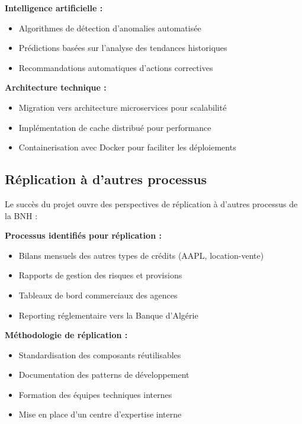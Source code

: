 \textbf{Intelligence artificielle :}
\begin{itemize}
    \item Algorithmes de détection d'anomalies automatisée
    \item Prédictions basées sur l'analyse des tendances historiques
    \item Recommandations automatiques d'actions correctives
\end{itemize}

\textbf{Architecture technique :}
\begin{itemize}
    \item Migration vers architecture microservices pour scalabilité
    \item Implémentation de cache distribué pour performance
    \item Containerisation avec Docker pour faciliter les déploiements
\end{itemize}

\subsection{Réplication à d'autres processus}

Le succès du projet ouvre des perspectives de réplication à d'autres processus de la BNH :

\medskip

\textbf{Processus identifiés pour réplication :}
\begin{itemize}
    \item Bilans mensuels des autres types de crédits (AAPL, location-vente)
    \item Rapports de gestion des risques et provisions
    \item Tableaux de bord commerciaux des agences
    \item Reporting réglementaire vers la Banque d'Algérie
\end{itemize}

\textbf{Méthodologie de réplication :}
\begin{itemize}
    \item Standardisation des composants réutilisables
    \item Documentation des patterns de développement
    \item Formation des équipes techniques internes
    \item Mise en place d'un centre d'expertise interne
\end{itemize}

